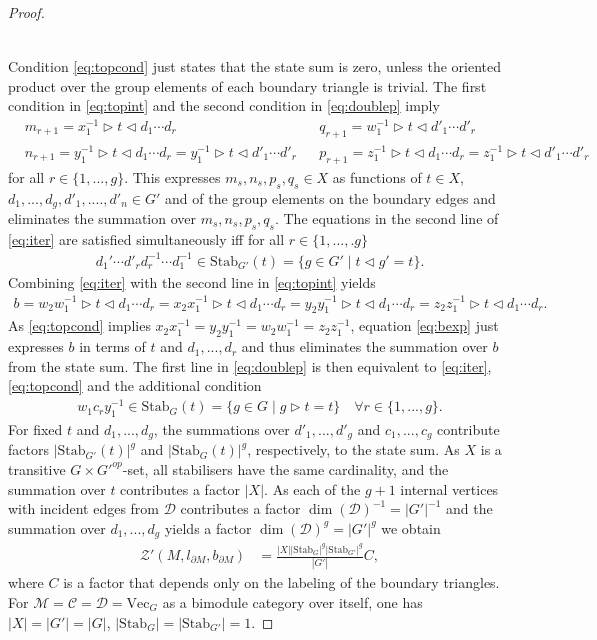 \documentclass[1.5pt, a4paper]{article}
\newcommand{\mac}{\mathcal C}
\newcommand{\mad}{\mathcal D}
\newcommand{\mam}{\mathcal M}
\newcommand{\inv}[0]{{-1}}
\begin{document}
\begin{proof}
\begin{itemize}
\begin{align}
\end{align}
\end{itemize}
Condition \eqref{eq:topcond} just states that the state sum is zero, unless the oriented product over the group elements of each boundary triangle is trivial. The first condition in \eqref{eq:topint} and the second condition in \eqref{eq:doublep} imply 
\begin{align} \label{eq:iter}
&m_{r+1}=x_1^\inv\rhd t\lhd d_1\cdots d_r & &q_{r+1}=w_1^\inv\rhd t\lhd d'_1\cdots d'_r\\
&n_{r+1}=y_1^\inv\rhd t\lhd d_1\cdots d_r=y_1^\inv\rhd t\lhd d'_1\cdots d'_r & 
&p_{r+1}=z_1^\inv\rhd t\lhd d_1\cdots d_r=z_1^\inv\rhd t\lhd d'_1\cdots d'_r\nonumber
\end{align}
for all $r\in\{1,...,g\}$.  This expresses  $m_s, n_s, p_s, q_s\in X$ as functions of $t\in X$, $d_1,...,d_g, d'_1,....,d'_n\in G'$ and of the group elements on the boundary edges and eliminates the summation over $m_s, n_s, p_s, q_s$. The equations in the second  line of \eqref{eq:iter} are satisfied simultaneously iff for all $r\in \{1,...,.g\}$
\begin{align}\label{eq:dcond}
d_1'\cdots d'_rd_r^\inv\cdots d_1^\inv\in \mathrm{Stab}_{G'}(t)=\{g\in G'\mid t\lhd g'=t\}.
\end{align}
Combining \eqref{eq:iter} with the second line in \eqref{eq:topint} yields
\begin{align}\label{eq:bexp}
b=w_2w_1^\inv\rhd t\lhd d_1\cdots d_r=x_2x_1^\inv\rhd t\lhd d_1\cdots d_r=y_2y_1^\inv\rhd t\lhd d_1\cdots d_r=z_2z_1^\inv\rhd t\lhd d_1\cdots d_r.
\end{align}
As \eqref{eq:topcond} implies $x_2x_1^\inv=y_2y_1^\inv=w_2w_1^\inv=z_2z_1^\inv$, equation \eqref{eq:bexp} just expresses $b$ in terms of $t$ and $d_1,...,d_r$ and thus eliminates the summation over $b$ from the state sum.  The first line in \eqref{eq:doublep} is then equivalent to \eqref{eq:iter}, \eqref{eq:topcond} and the additional condition
\begin{align}\label{eq:crcond}
w_1c_r y_1^\inv\in \mathrm{Stab}_G(t)=\{g\in G\mid g\rhd t=t\}\quad\forall r\in\{1,...,g\}.
\end{align}
 For fixed $t$ and $d_1,...,d_g$, the summations over $d'_1,...,d'_g$ and  $c_1,...,c_g$ 
contribute  factors $|\mathrm{Stab}_{G'}(t)|^g$ and $|\mathrm{Stab}_G(t)|^g$, respectively, to the state sum. As $X$ is a transitive $G\times G'^{op}$-set, all stabilisers have the same cardinality, and the summation over $t$ contributes a factor $|X|$.  
As each of the $g+1$ internal  vertices with incident edges from $\mad$  contributes a factor $\dim(\mad)^\inv=|G'|^\inv$ and the summation over  $d_1,...,d_g$ yields a factor $\dim(\mad)^g=|G'|^g$ we obtain
\begin{align*}
\mathcal Z'(M, l_{\partial M}, b_{\partial M})
&=
 \frac{|X| |\mathrm{Stab}_G|^g |\mathrm{Stab}_{G'}|^g}{|G'| } C,
\end{align*}
where $C$ is a factor that depends only on the labeling of the boundary triangles.
For $\mam=\mac=\mad=\mathrm{Vec}_G$ as a bimodule category over itself,  one has $|X|=|G'|=|G|$, $|\mathrm{Stab}_G|=|\mathrm{Stab}_{G'}|=1$. 
 \end{proof}
 
\end{document}
